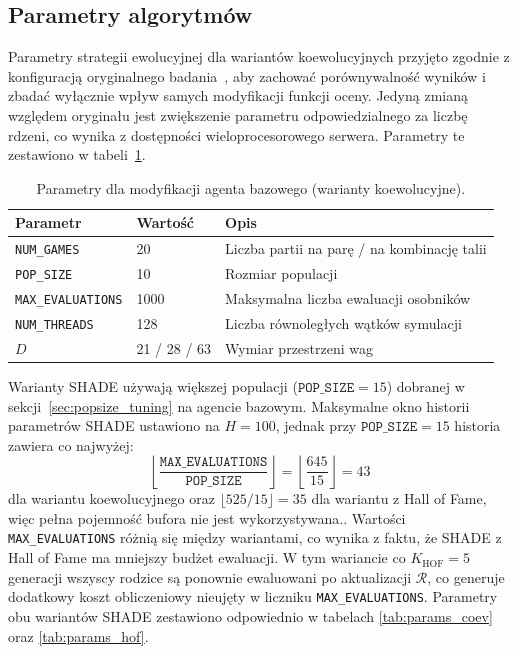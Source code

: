 \subsection{Parametry algorytmów}
\label{sec:params}

Parametry strategii ewolucyjnej dla wariantów koewolucyjnych przyjęto zgodnie z konfiguracją oryginalnego badania~\cite{sanchez2020}, aby zachować porównywalność wyników i zbadać wyłącznie wpływ samych modyfikacji funkcji oceny. Jedyną zmianą względem oryginału jest zwiększenie parametru odpowiedzialnego za liczbę rdzeni, co wynika  z dostępności wieloprocesorowego serwera. Parametry te zestawiono w tabeli~\ref{tab:params_base}.

\begin{table}[ht]
\centering
\caption{Parametry dla modyfikacji agenta bazowego (warianty koewolucyjne).}
\label{tab:params_base}
\begin{tabular}{lll}
\toprule
Parametr & Wartość & Opis \\
\midrule
\texttt{NUM\_GAMES}       & 20           & Liczba partii na parę / na kombinację talii \\
\texttt{POP\_SIZE}        & 10           & Rozmiar populacji \\
\texttt{MAX\_EVALUATIONS} & 1000         & Maksymalna liczba ewaluacji osobników \\
\texttt{NUM\_THREADS}     & 128          & Liczba równoległych wątków symulacji \\
$D$                       & 21 / 28 / 63 & Wymiar przestrzeni wag \\
\bottomrule
\end{tabular}
\end{table}

Warianty SHADE używają większej populacji ($\texttt{POP\_SIZE} = 15$) dobranej w sekcji~\ref{sec:popsize_tuning} na agencie bazowym. Maksymalne okno historii parametrów SHADE ustawiono na $H = 100$, jednak
przy $\texttt{POP\_SIZE} = 15$ historia zawiera co najwyżej:
\[
\left\lfloor \frac{\texttt{MAX\_EVALUATIONS}}{\texttt{POP\_SIZE}} \right\rfloor
= \left\lfloor \frac{645}{15} \right\rfloor = 43
\]
dla wariantu koewolucyjnego oraz $\lfloor 525 / 15 \rfloor = 35$ dla wariantu
z Hall of Fame, więc pełna pojemność bufora nie jest wykorzystywana.. Wartości \texttt{MAX\_EVALUATIONS} różnią się między wariantami, co wynika z faktu, że SHADE z Hall of Fame ma mniejszy budżet ewaluacji. W tym wariancie co $K_{\text{HOF}} = 5$ generacji wszyscy rodzice są ponownie ewaluowani po aktualizacji $\mathcal{R}$, co generuje dodatkowy koszt obliczeniowy nieujęty w liczniku \texttt{MAX\_EVALUATIONS}. Parametry obu wariantów SHADE zestawiono odpowiednio w tabelach \ref{tab:params_coev} oraz \ref{tab:params_hof}.

